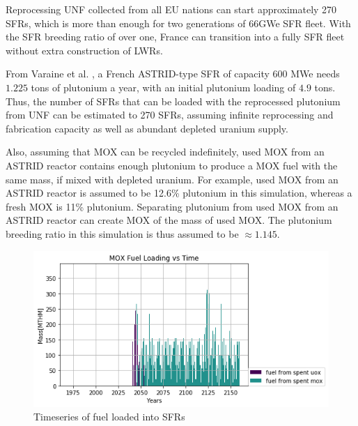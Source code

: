 	Reprocessing \gls{UNF} collected from all EU nations can start approximately
	270 \glspl{SFR}, which is more than enough for two generations of 66GWe \gls{SFR}
	fleet. With the \gls{SFR} breeding ratio of over one, France can transition into
	a fully \gls{SFR} fleet without extra construction of \glspl{LWR}. 
	
				
	From Varaine et al. \cite{varaine_pre-conceptual_2012}, a French
	ASTRID-type \gls{SFR} of capacity 600 MWe needs $1.225$ tons of
	plutonium a year, with an initial plutonium loading of $4.9$ tons. 
	Thus, the number of \glspl{SFR} that can be loaded with the reprocessed
	plutonium from \gls{UNF} can be estimated to 270 \glspl{SFR},
	assuming infinite reprocessing and fabrication capacity as well as
	abundant depleted uranium supply. 
	
	Also, assuming that \gls{MOX} can be recycled indefinitely,
	used \gls{MOX} from an ASTRID reactor contains enough plutonium to produce a \gls{MOX} fuel with
	the same mass, if mixed with depleted uranium. For example,
	used \gls{MOX} from an ASTRID reactor is assumed to be 12.6\% plutonium
	in this simulation, whereas a fresh \gls{MOX} is 11\% plutonium.
	Separating plutonium from used \gls{MOX} from
	an ASTRID reactor can create \gls{MOX} of the mass of used \gls{MOX}.
	The plutonium breeding ratio in this simulation is thus assumed to be
	$\approx 1.145$.
	
	
	\begin{figure}[htbp!]
		\begin{center}
			\includegraphics[width=\columnwidth]{./images/french-transition/where_fuel.png}
		\end{center}
		\caption{Timeseries of fuel loaded into \glspl{SFR}}
		\label{fig:fuel}
	\end{figure}
	
